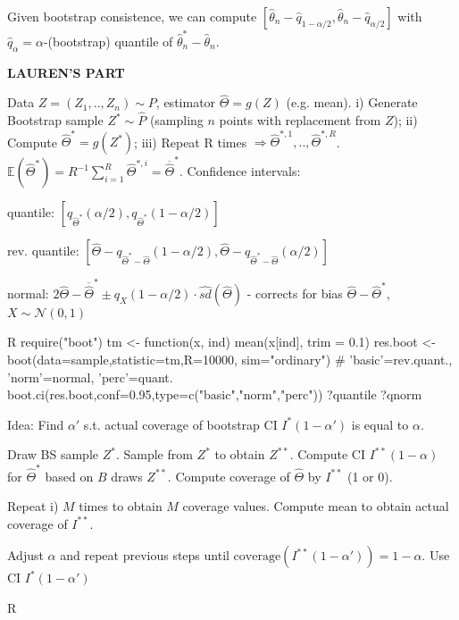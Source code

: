 \begin{sectionbox}\nospacing{}
  Given bootstrap consistence, we can compute $[\hat \theta_n - \hat q_{1-\alpha/2}, \hat\theta_n - \hat q_{\alpha/2}]$ with $\hat q_\alpha = \alpha$-(bootstrap) quantile of $\hat\theta_n^\ast - \hat \theta_n$.
\end{sectionbox}

\textbf{LAUREN'S PART}
\begin{sectionbox}
Data $Z = (Z_1,..,Z_n) \sim P$, estimator $\hat{\Theta} = g(Z)$ (e.g. mean). i) Generate Bootstrap sample $Z^{\ast} \sim \hat{P}$ (sampling $n$ points with replacement from $Z$); ii) Compute $\hat{\Theta}^{\ast} = g(Z^{\ast})$; iii) Repeat R times $\Rightarrow \hat{\Theta}^{\ast,1},..,\hat{\Theta}^{\ast,R}$. $\mathbb{E}(\hat{\Theta}^{\ast}) = R^{-1}\sum_{i=1}^{R}\hat{\Theta}^{\ast,i} = \overline{\hat{\Theta}}^{\ast}$. Confidence intervals: 
\begin{enumeratenosep}[label=\roman*]
	\item quantile: $ [q_{\hat{\Theta}^{\ast}}(\alpha/2), q_{\hat{\Theta}^{\ast}}(1-\alpha/2)]  $
	\item rev. quantile: $ [\hat{\Theta} - q_{\hat{\Theta}^{\ast}-\hat{\Theta}}(1-\alpha/2), \hat{\Theta} - q_{\hat{\Theta}^{\ast}-\hat{\Theta}}(\alpha/2)]   $
	\item normal: $2\hat{\Theta}-\overline{\hat{\Theta}}^{\ast} \pm q_X(1-\alpha/2)\cdot \hat{sd}(\hat{\Theta})$ - corrects for bias $\hat{\Theta} - \hat{\Theta}^{\ast}$, $X \sim \mathcal{N}(0,1)$ 
\end{enumeratenosep}
\begin{mintlinebox}{R}
	require("boot")
	tm <- function(x, ind) {mean(x[ind], trim = 0.1)}
	res.boot <- boot(data=sample,statistic=tm,R=10000,
	sim="ordinary")
	# 'basic'=rev.quant., 'norm'=normal, 'perc'=quant.
	boot.ci(res.boot,conf=0.95,type=c("basic","norm","perc"))
	?quantile ?qnorm
\end{mintlinebox}
\end{sectionbox}

\begin{sectionbox}
Idea: Find $\alpha'$ s.t. actual coverage of bootstrap CI $I^{\ast}(1-\alpha')$ is equal to $\alpha$.
\begin{enumeratenosep}[label=\roman*]
	\item Draw BS sample $Z^{\ast}$. Sample from $Z^{\ast}$ to obtain $Z^{\ast\ast}$. Compute CI $I^{\ast\ast}(1-\alpha)$ for $\hat{\Theta}^{\ast}$ based on $B$ draws $Z^{\ast\ast}$. Compute coverage of $\hat{\Theta}$ by $I^{\ast\ast}$ (1 or 0).
	\item Repeat i) $M$ times to obtain $M$ coverage values. Compute mean to obtain actual coverage of $I^{\ast\ast}$.
	\item Adjust $\alpha$ and repeat previous steps until $\text{coverage}(I^{\ast\ast}(1-\alpha')) = 1 -\alpha$. Use CI $I^{\ast}(1-\alpha')$
\end{enumeratenosep}

	\begin{mintlinebox}{R}

	\end{mintlinebox}		
\end{sectionbox}	

